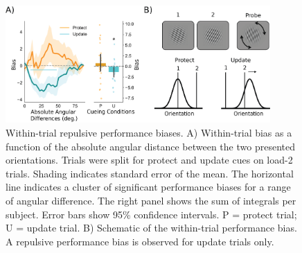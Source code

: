 \documentclass{article}
\begin{document}
\begin{large}
\begin{figure}
\centering\includegraphics[width=0.9\textwidth]{figures/figure2_behav_within_trial.png} 
\caption[Within-trial repulsive performance biases.]{Within-trial repulsive performance biases. A) Within-trial bias as a function of the absolute angular distance between the two presented orientations. Trials were split for protect and update cues on load-2 trials. Shading indicates standard error of the mean. The horizontal line indicates a cluster of significant performance biases for a range of angular difference. The right panel shows the sum of integrals per subject. Error bars show 95\% confidence intervals. P = protect trial; U = update trial. B) Schematic of the within-trial performance bias. A repulsive performance bias is observed for update trials only.}
\label{fig:behav_repulsive}\end{figure}


\end{large}
\end{document}

